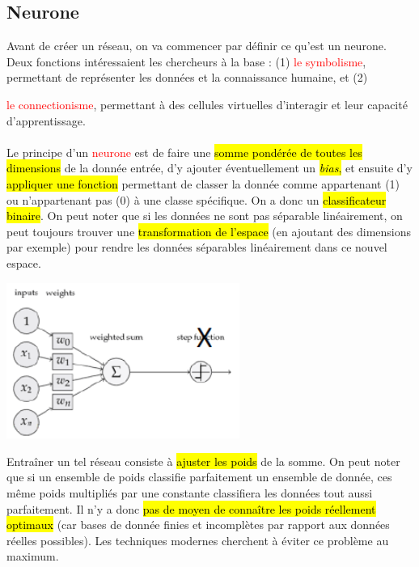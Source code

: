 \documentclass[letterpaper, 12pt]{article}
\newcommand{\alinea}{
\hspace*{0.5cm}}
\newcommand{\red}[1]{
	\textcolor{red}{#1}}
\begin{document}
		\subsection{Neurone}
			\alinea Avant de créer un réseau, on va commencer par définir ce qu'est un neurone. Deux fonctions intéressaient les chercheurs 
				à la base : (1) \red{le symbolisme}, permettant de représenter les données et la connaissance humaine, et (2) 
				\red{le connectionisme}, permettant à des cellules virtuelles d'interagir et leur capacité d'apprentissage.\\
			~\\
			\alinea Le principe d'un \red{neurone} est de faire une \hl{somme pondérée de toutes les dimensions} de la donnée entrée,
				d'y ajouter éventuellement un \hl{\textit{bias},} et ensuite d'y \hl{appliquer une fonction} permettant
				de classer la donnée comme appartenant (1) ou n'appartenant pas (0) à une classe spécifique. On a donc un
				\hl{classificateur binaire}. On peut noter que si les données ne sont pas séparable linéairement, on peut
				toujours trouver une \hl{transformation de l'espace} (en ajoutant des dimensions par exemple) pour rendre les 
				données séparables linéairement dans ce nouvel espace.
			\begin{center}
				\includegraphics[width=3in]{Images/neuron}
			\end{center}
			\alinea Entraîner un tel réseau consiste à \hl{ajuster les poids} de la somme. On peut noter que si un ensemble de poids
				classifie parfaitement un ensemble de donnée, ces même poids multipliés par une constante classifiera les données
				tout aussi parfaitement. Il n'y a donc \hl{pas de moyen de connaître les poids réellement optimaux} (car bases de donnée
				finies et incomplètes par rapport aux données réelles possibles). Les techniques modernes cherchent à éviter ce problème
				au maximum.
\end{document}
